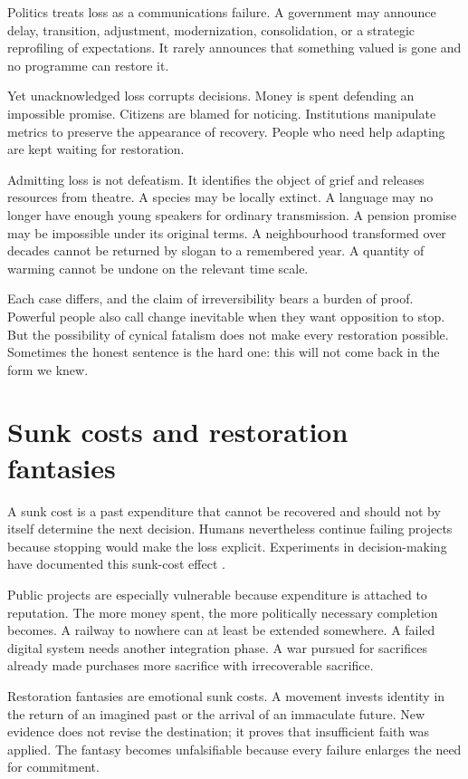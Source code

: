 \documentclass[12pt,a4paper]{book}
\begin{document}
Politics treats loss as a communications failure.  A government may announce
delay, transition, adjustment, modernization, consolidation, or a strategic
reprofiling of expectations.  It rarely announces that something valued is
gone and no programme can restore it.

Yet unacknowledged loss corrupts decisions.  Money is spent defending an
impossible promise.  Citizens are blamed for noticing.  Institutions manipulate
metrics to preserve the appearance of recovery.  People who need help adapting
are kept waiting for restoration.

Admitting loss is not defeatism.  It identifies the object of grief and releases
resources from theatre.  A species may be locally extinct.  A language may no
longer have enough young speakers for ordinary transmission.  A pension promise
may be impossible under its original terms.  A neighbourhood transformed over
decades cannot be returned by slogan to a remembered year.  A quantity of
warming cannot be undone on the relevant time scale.

Each case differs, and the claim of irreversibility bears a burden of proof.
Powerful people also call change inevitable when they want opposition to stop.
But the possibility of cynical fatalism does not make every restoration
possible.  Sometimes the honest sentence is the hard one: this will not come
back in the form we knew.

\section{Sunk costs and restoration fantasies}

A sunk cost is a past expenditure that cannot be recovered and should not by
itself determine the next decision.  Humans nevertheless continue failing
projects because stopping would make the loss explicit.  Experiments in
decision-making have documented this sunk-cost effect
\cite{ArkesBlumerSunkCost1985}.

Public projects are especially vulnerable because expenditure is attached to
reputation.  The more money spent, the more politically necessary completion
becomes.  A railway to nowhere can at least be extended somewhere.  A failed
digital system needs another integration phase.  A war pursued for sacrifices
already made purchases more sacrifice with irrecoverable sacrifice.

Restoration fantasies are emotional sunk costs.  A movement invests identity
in the return of an imagined past or the arrival of an immaculate future.  New
evidence does not revise the destination; it proves that insufficient faith was
applied.  The fantasy becomes unfalsifiable because every failure enlarges the
need for commitment.
\end{document}
